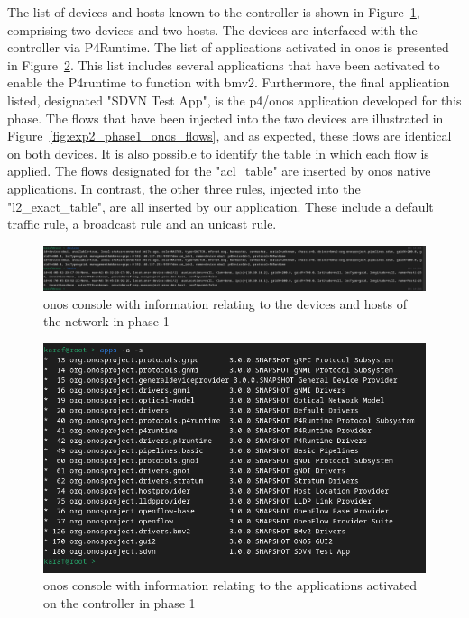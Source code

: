 The list of devices and hosts known to the controller is shown in Figure~\ref{fig:exp2_phase1_onos}, comprising two devices and two hosts. The devices are interfaced with the controller via P4Runtime. The list of applications activated in \gls{onos} is presented in Figure~\ref{fig:exp2_phase1_onos_apps}. This list includes several applications that have been activated to enable the P4runtime to function with \gls{bmv2}. Furthermore, the final application listed, designated "SDVN Test App", is the \gls{p4}/\gls{onos} application developed for this phase.
The flows that have been injected into the two devices are illustrated in Figure~\ref{fig:exp2_phase1_onos_flows}, and as expected, these flows are identical on both devices.
It is also possible to identify the table in which each flow is applied. The flows designated for the "acl\_table" are inserted by \gls{onos} native applications. In contrast, the other three rules, injected into the "l2\_exact\_table", are all inserted by our application. These include a default traffic rule, a broadcast rule and an unicast rule.

\begin{figure}
	\centering
	\includegraphics[width=\textwidth]{Chapters/Figures/tests/bmv2_phase_1/onos_topology.PNG}
	\caption{\gls{onos} console with information relating to the devices and hosts of the network in phase 1}
	\label{fig:exp2_phase1_onos}
\end{figure}

\begin{figure}
	\centering
	\includegraphics[width=\textwidth]{Chapters/Figures/tests/bmv2_phase_1/onos_apps.PNG}
	\caption{\gls{onos} console with information relating to the applications activated on the controller in phase 1}
	\label{fig:exp2_phase1_onos_apps}
\end{figure}

